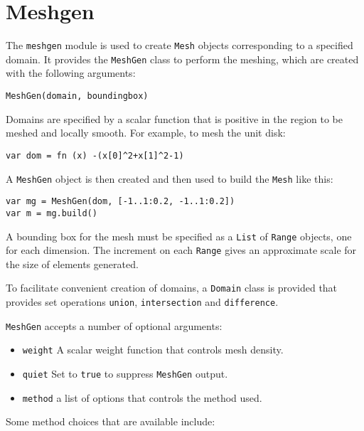 \hypertarget{meshgen}{%
\section{Meshgen}\label{meshgen}}

The \texttt{meshgen} module is used to create \texttt{Mesh} objects
corresponding to a specified domain. It provides the \texttt{MeshGen}
class to perform the meshing, which are created with the following
arguments:

\begin{lstlisting}
MeshGen(domain, boundingbox)
\end{lstlisting}

Domains are specified by a scalar function that is positive in the
region to be meshed and locally smooth. For example, to mesh the unit
disk:

\begin{lstlisting}
var dom = fn (x) -(x[0]^2+x[1]^2-1)
\end{lstlisting}

A \texttt{MeshGen} object is then created and then used to build the
\texttt{Mesh} like this:

\begin{lstlisting}
var mg = MeshGen(dom, [-1..1:0.2, -1..1:0.2])
var m = mg.build()
\end{lstlisting}

A bounding box for the mesh must be specified as a \texttt{List} of
\texttt{Range} objects, one for each dimension. The increment on each
\texttt{Range} gives an approximate scale for the size of elements
generated.

To facilitate convenient creation of domains, a \texttt{Domain} class is
provided that provides set operations \texttt{union},
\texttt{intersection} and \texttt{difference}.

\texttt{MeshGen} accepts a number of optional arguments:

\begin{itemize}

\item
  \texttt{weight} A scalar weight function that controls mesh density.
\item
  \texttt{quiet} Set to \texttt{true} to suppress \texttt{MeshGen}
  output.
\item
  \texttt{method} a list of options that controls the method used.
\end{itemize}

Some method choices that are available include:

